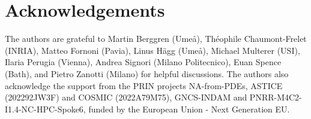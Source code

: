 \documentclass[a4paper]{article}
\theoremstyle{plain}
\theoremstyle{definition}
\begin{document}
\section*{Acknowledgements}
The authors are grateful to
Martin Berggren (Ume\aa{}),
Th\'eophile Chaumont-Frelet (INRIA),
Matteo Fornoni (Pavia),
Linus H\"agg (Ume\aa{}),
Michael Multerer (USI),
Ilaria Perugia (Vienna),
Andrea Signori (Milano Politecnico),
Euan Spence (Bath), and
Pietro Zanotti (Milano)
for helpful discussions.
The authors also acknowledge the support from the PRIN projects NA-from-PDEs, ASTICE (202292JW3F) and COSMIC (2022A79M75), GNCS-INDAM and PNRR-M4C2-I1.4-NC-HPC-Spoke6, funded by the European Union - Next Generation EU.



\end{document}
